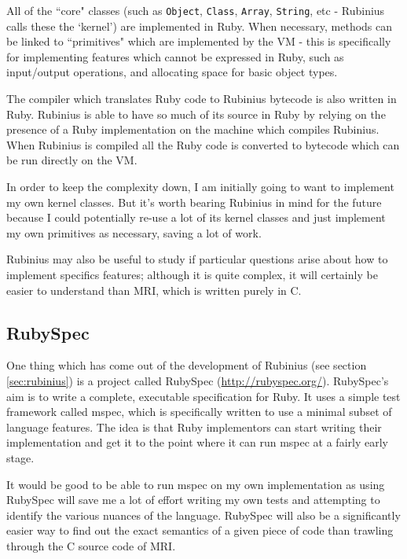 All of the ``core" classes (such as \texttt{Object}, \texttt{Class}, \texttt{Array}, \texttt{String}, etc - Rubinius calls these the `kernel') are implemented in Ruby. When necessary, methods can be linked to ``primitives" which are implemented by the VM - this is specifically for implementing features which cannot be expressed in Ruby, such as input/output operations, and allocating space for basic object types.

The compiler which translates Ruby code to Rubinius bytecode is also written in Ruby. Rubinius is able to have so much of its source in Ruby by relying on the presence of a Ruby implementation on the machine which compiles Rubinius. When Rubinius is compiled all the Ruby code is converted to bytecode which can be run directly on the \gls{VM}.

In order to keep the complexity down, I am initially going to want to implement my own kernel classes. But it's worth bearing Rubinius in mind for the future because I could potentially re-use a lot of its kernel classes and just implement my own primitives as necessary, saving a lot of work.

Rubinius may also be useful to study if particular questions arise about how to implement specifics features; although it is quite complex, it will certainly be easier to understand than \gls{MRI}, which is written purely in C.

\subsection{RubySpec}

One thing which has come out of the development of Rubinius (see section \ref{sec:rubinius}) is a project called RubySpec (\url{http://rubyspec.org/}). RubySpec's aim is to write a complete, executable specification for Ruby. It uses a simple test framework called mspec, which is specifically written to use a minimal subset of language features. The idea is that Ruby implementors can start writing their implementation and get it to the point where it can run mspec at a fairly early stage.

It would be good to be able to run mspec on my own implementation as using RubySpec will save me a lot of effort writing my own tests and attempting to identify the various nuances of the language. RubySpec will also be a significantly easier way to find out the exact semantics of a given piece of code than trawling through the C source code of \gls{MRI}.
